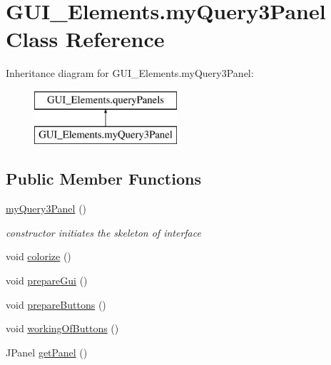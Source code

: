 \hypertarget{class_g_u_i___elements_1_1my_query3_panel}{}\section{G\+U\+I\+\_\+\+Elements.\+my\+Query3\+Panel Class Reference}
\label{class_g_u_i___elements_1_1my_query3_panel}
Inheritance diagram for G\+U\+I\+\_\+\+Elements.\+my\+Query3\+Panel\+:\begin{figure}[H]
\begin{center}
\leavevmode
\includegraphics[height=2.000000cm]{class_g_u_i___elements_1_1my_query3_panel}
\end{center}
\end{figure}
\subsection*{Public Member Functions}
\begin{DoxyCompactItemize}
\item 
\hyperlink{class_g_u_i___elements_1_1my_query3_panel_a6d672bacf210e53a00e148a27a4ea2b8}{my\+Query3\+Panel} ()
\begin{DoxyCompactList}\small\item\em constructor initiates the skeleton of interface \end{DoxyCompactList}\item 
void \hyperlink{class_g_u_i___elements_1_1my_query3_panel_ad3c37661350b9ed95d749ca33450ff69}{colorize} ()
\item 
void \hyperlink{class_g_u_i___elements_1_1my_query3_panel_a0edd26c1cd0bd4b5621508c32b89d362}{prepare\+Gui} ()
\item 
void \hyperlink{class_g_u_i___elements_1_1my_query3_panel_a51ae30aafd90618c99d3b6b67734ddd3}{prepare\+Buttons} ()
\item 
void \hyperlink{class_g_u_i___elements_1_1my_query3_panel_a09bd68ef59c9ffadd8e72abf72186533}{working\+Of\+Buttons} ()
\item 
J\+Panel \hyperlink{class_g_u_i___elements_1_1my_query3_panel_ad792ef80368c829d32e9329a2ba7bb17}{get\+Panel} ()
\end{DoxyCompactItemize}


